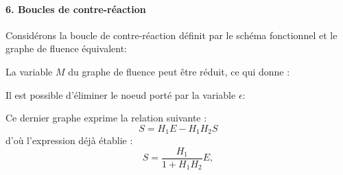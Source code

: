 \paragraph{6. Boucles de contre-réaction}

Considérons la boucle de contre-réaction définit par le schéma fonctionnel et 
le graphe de fluence équivalent:
\begin{center}
\end{center}

La variable $M$ du graphe de fluence peut être réduit, ce qui donne :

\begin{center}
\end{center}

Il est possible d'éliminer le noeud porté par la variable $\epsilon$:

\begin{center}
\end{center}
Ce dernier graphe exprime la relation suivante :
$$
S=H_1E-H_1H_2S
$$
d'où l'expression déjà établie :
$$
    S=\dfrac{H_1}{1+H_1H_2}E,
$$

